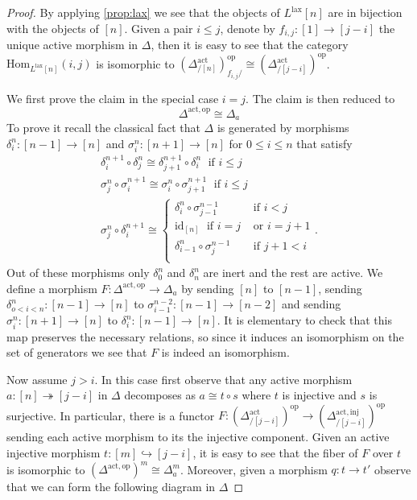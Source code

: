 \documentclass[a4paper, reqno]{amsart}
\theoremstyle{definition}
\newcommand\id{\mathrm{id}}
\newcommand\mor{\mathrm{Hom}}
\newcommand\inj{\mathrm{inj}}
\newcommand\op{\mathrm{op}}
\newcommand\lax{\mathrm{lax}}
\newcommand\act{\mathrm{act}}
\begin{document}
\begin{proof}
By applying \cref{prop:lax} we see that the objects of $L^\lax [n]$ are in bijection with the objects of $[n]$. Given a pair $i\leq j$, denote by $f_{i,j}:[1]\rightarrow[j-i]$ the unique active morphism in $\Delta$, then it is easy to see that the category $\mor_{L^\lax[n]}(i,j)$ is isomorphic to $(\Delta^\act_{/[n]})^\op_{f_{i,j}/}\cong(\Delta^\act_{/[j-i]})^\op$.\par
We first prove the claim in the special case $i=j$. The claim is then reduced to
\[\Delta^{\act,\op}\cong\Delta_a\]
To prove it recall the classical fact that $\Delta$ is generated by morphisms $\delta^n_i:[n-1]\rightarrow[n]$  and $\sigma^n_i:[n+1]\rightarrow[n]$ for $0\leq i\leq n$ that satisfy
\begin{gather*}
    \delta^{n+1}_i\circ \delta^n_j\cong \delta^{n+1}_{j+1}\circ \delta^{n}_i\;\text{    if }i\leq j\\
    \sigma^{n}_j\circ \sigma^{n+1}_i\cong \sigma^n_{i}\circ \sigma^{n+1}_{j+1}\; \text{ if }i\leq j\\
    \sigma^n_j\circ \delta^{n+1}_i\cong 
    \begin{cases}
        \delta^n_i\circ \sigma^{n-1}_{j-1}&\text{    if }i< j\\
        \id_{[n]} \;\text{    if }i=j&\text{ or }i=j+1\\
        \delta^n_{i-1}\circ \sigma^{n-1}_{j}&\text{    if }j+1< i\\
    \end{cases}.
\end{gather*}
Out of these morphisms only $\delta^n_0$ and $\delta^n_n$ are inert and the rest are active. We define a morphism $F:\Delta^{\act,\op}\rightarrow\Delta_a$ by sending $[n]$ to $[n-1]$, sending $\delta^n_{o<i<n}:[n-1]\rightarrow[n]$ to $\sigma^{n-2}_{i-1}:[n-1]\rightarrow[n-2]$ and sending $\sigma^n_i:[n+1]\rightarrow[n]$ to $\delta^n_i:[n-1]\rightarrow[n]$. It is elementary to check that this map preserves the necessary relations, so since it induces an isomorphism on the set of generators we see that $F$ is indeed an isomorphism.\par
Now assume $j>i$. In this case first observe that any active morphism $a:[n]\twoheadrightarrow[j-i]$ in $\Delta$ decomposes as $a\cong t\circ s$ where $t$ is injective and $s$ is surjective. In particular, there is a functor $F:(\Delta^\act_{/[j-i]})^\op\rightarrow(\Delta^{\act,\inj}_{/[j-i]})^\op$ sending each active morphism to its the injective component. Given an active injective morphism $t:[m]\hookrightarrow[j-i]$, it is easy to see that the fiber of $F$ over $t$ is isomorphic to $(\Delta^{\act,\op})^m\cong\Delta_a^m$. Moreover, given a morphism $q:t\rightarrow t'$ observe that we can form the following diagram in $\Delta$

\end{proof}
\end{document}
